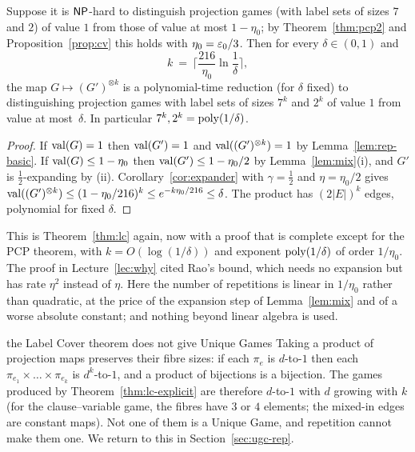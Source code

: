 \begin{theorem}\label{thm:lc-explicit}
Suppose it is $\mathsf{NP}$-hard to distinguish projection games (with label sets of sizes $7$ and $2$) of value $1$ from those of value at most $1-\eta_0$; by Theorem~\ref{thm:pcp2} and Proposition~\ref{prop:cv} this holds with $\eta_0=\varepsilon_0/3$.  Then for every $\delta\in(0,1)$ and
\[
  k\ =\ \Big\lceil\frac{216}{\eta_0}\ln\frac1\delta\Big\rceil,
\]
the map $G\mapsto(G')^{\otimes k}$ is a polynomial-time reduction (for $\delta$ fixed) to distinguishing projection games with label sets of sizes $7^k$ and $2^k$ of value $1$ from value at most~$\delta$.  In particular $7^k,2^k=\operatorname{poly}(1/\delta)$.
\end{theorem}
\begin{proof}
If $\operatorname{val}(G)=1$ then $\operatorname{val}(G')=1$ and $\operatorname{val}((G')^{\otimes k})=1$ by Lemma~\ref{lem:rep-basic}.  If $\operatorname{val}(G)\le1-\eta_0$ then $\operatorname{val}(G')\le1-\eta_0/2$ by Lemma~\ref{lem:mix}(i), and $G'$ is $\frac12$-expanding by (ii).  Corollary~\ref{cor:expander} with $\gamma=\frac12$ and $\eta=\eta_0/2$ gives
$\operatorname{val}((G')^{\otimes k})\le(1-\eta_0/216)^k\le e^{-k\eta_0/216}\le\delta$.  The product has $(2|E|)^k$ edges, polynomial for fixed $\delta$.
\end{proof}

\noindent
This is Theorem~\ref{thm:lc} again, now with a proof that is complete except for the PCP theorem, with $k=O(\log(1/\delta))$ and exponent $\operatorname{poly}(1/\delta)$ of order $1/\eta_0$.
The proof in Lecture~\ref{lec:why} cited Rao's bound, which needs no expansion but has rate $\eta^2$ instead of $\eta$.  Here the number of repetitions is linear in $1/\eta_0$ rather than quadratic, at the price of the expansion step of Lemma~\ref{lem:mix} and of a worse absolute constant; and nothing beyond linear algebra is used.

\begin{pitfall}{the Label Cover theorem does not give Unique Games}
Taking a product of projection maps preserves their fibre sizes: if each $\pi_e$ is $d$-to-$1$ then each $\pi_{e_1}\times\dots\times\pi_{e_k}$ is $d^k$-to-$1$, and a product of bijections is a bijection.
The games produced by Theorem~\ref{thm:lc-explicit} are therefore $d$-to-$1$ with $d$ growing with $k$ (for the clause--variable game, the fibres have $3$ or $4$ elements; the mixed-in edges are constant maps).
Not one of them is a Unique Game, and repetition cannot make them one.  We return to this in Section~\ref{sec:ugc-rep}.
\end{pitfall}


